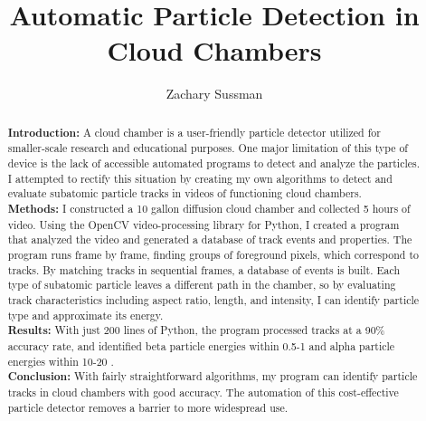 \documentclass[notitlepage]{article}
\author{Zachary Sussman}
\title{Automatic Particle Detection in Cloud Chambers}
\date{}
\begin{document}
 



\maketitle

\begin{abstract}
\noindent
\textbf{Introduction:} A cloud chamber is a user-friendly particle detector utilized for smaller-scale research and educational purposes.  One major limitation of this type of device is the lack of accessible automated programs to detect and analyze the particles. I attempted to rectify this situation by creating my own algorithms to detect and evaluate subatomic particle tracks in videos of functioning cloud chambers.
\\ \textbf{Methods:} I constructed a 10 gallon diffusion cloud chamber and collected 5 hours of video.  Using the OpenCV video-processing library for Python, I created a program that analyzed the video and generated a database of track events and properties. The program runs frame by frame, finding groups of foreground pixels, which correspond to tracks.  By matching tracks in sequential frames, a database of events is built. Each type of subatomic particle leaves a different path in the chamber, so by evaluating track characteristics including aspect ratio, length, and intensity, I can identify particle type and approximate its energy.
\\ \textbf{Results:} With just 200 lines of Python, the program processed tracks at a 90\% accuracy rate, and identified beta particle energies within 0.5-1 \kilo{}\electronvolt and alpha particle energies within 10-20 \kilo{}\electronvolt. 
\\ \textbf{Conclusion:} With fairly straightforward algorithms, my program can identify particle tracks in cloud chambers with good accuracy. The automation of this cost-effective particle detector removes a barrier to more widespread use.


\end{abstract}
\end{document}
